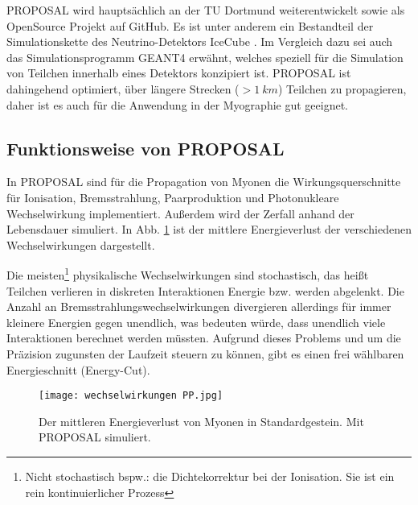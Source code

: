 PROPOSAL wird hauptsächlich an der TU Dortmund weiterentwickelt 
sowie als OpenSource Projekt auf GitHub. 
Es ist unter anderem ein Bestandteil der Simulationskette des Neutrino-Detektors IceCube \cite{icecube}.
Im Vergleich dazu sei auch das Simulationsprogramm GEANT4 erwähnt, welches speziell
für die Simulation von Teilchen innerhalb eines Detektors konzipiert ist.
PROPOSAL ist dahingehend optimiert, über längere Strecken ($> \SI[]{1}[]{km}$) Teilchen 
zu propagieren, daher ist es auch für die Anwendung in der Myographie
gut geeignet.

\subsection{Funktionsweise von PROPOSAL}
\label{sec:pp-theorie}

In PROPOSAL sind für die Propagation von Myonen die Wirkungsquerschnitte für 
Ionisation, Bremsstrahlung, Paarproduktion und Photonukleare Wechselwirkung 
implementiert. Außerdem wird der Zerfall anhand der Lebensdauer simuliert. \cite{proposal}
In Abb. \ref{fig:energieverlust_pp} ist der mittlere Energieverlust
der verschiedenen Wechselwirkungen dargestellt.

Die meisten\footnote{Nicht stochastisch bspw.: 
die Dichtekorrektur bei der Ionisation. Sie ist ein rein kontinuierlicher Prozess} 
physikalische Wechselwirkungen sind stochastisch, das heißt
Teilchen verlieren in diskreten Interaktionen Energie bzw. werden abgelenkt.
Die Anzahl an Bremsstrahlungswechselwirkungen divergieren allerdings für 
immer kleinere Energien gegen unendlich, was bedeuten würde, dass unendlich 
viele Interaktionen berechnet werden müssten. 
Aufgrund dieses Problems und um die Präzision zugunsten der Laufzeit steuern
zu können, gibt es einen frei wählbaren Energieschnitt (Energy-Cut).

\begin{figure}[]
    \centering
    \texttt{[image: wechselwirkungen PP.jpg]}
    \caption{Der mittleren Energieverlust von Myonen in Standardgestein. Mit PROPOSAL simuliert.}
    \label{fig:energieverlust_pp}
\end{figure}

